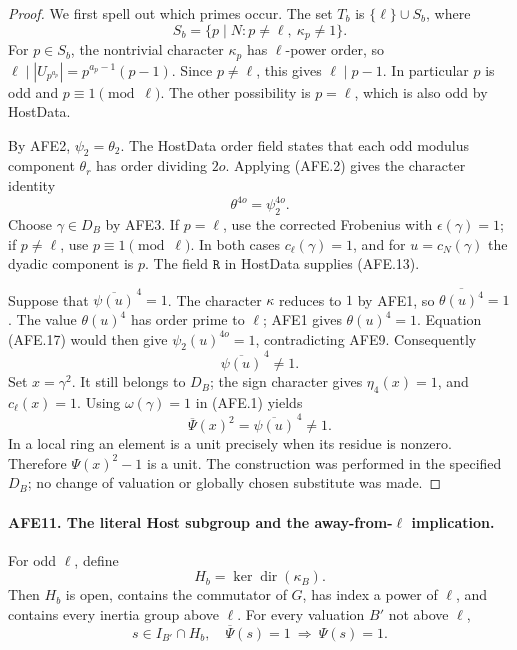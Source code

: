 \documentclass[11pt,a4paper]{article}
\numberwithin{equation}{section}
\theoremstyle{remark}\newtheorem{remark}[theorem]{Remark}
\begin{document}
\begin{proof}
We first spell out which primes occur.
The set \(T_b\) is \(\{\ell\}\cup S_b\), where
\[
 S_b=\{p\mid N:p\ne\ell,\ \kappa_p\ne1\}.
 \]
For \(p\in S_b\), the nontrivial character
\(\kappa_p\) has \(\ell\)-power order, so
\(\ell\mid |U_{p^{a_p}}|=p^{a_p-1}(p-1)\).
Since \(p\ne\ell\), this gives
\(\ell\mid p-1\).  In particular \(p\) is odd and
\(p\equiv1\pmod\ell\).
The other possibility is \(p=\ell\), which is
also odd by HostData.

By AFE2, \(\psi_2=\theta_2\).
The HostData order field states that each odd
modulus component \(\theta_r\) has order dividing
\(2o\).  Applying (AFE.2) gives the character identity
\[
                         \theta^{4o}=\psi_2^{4o}.
                                                        \tag{AFE.17}
\]
Choose \(\gamma\in D_B\) by AFE3.  If \(p=\ell\),
use the corrected Frobenius with \(\epsilon(\gamma)=1\);
if \(p\ne\ell\), use \(p\equiv1\pmod\ell\).
In both cases \(c_\ell(\gamma)=1\), and for
\(u=c_N(\gamma)\) the dyadic component is \(p\).
The field \(\texttt{R}\) in HostData supplies (AFE.13).

Suppose that \(\overline{\psi(u)}^{\,4}=1\).
The character \(\kappa\) reduces to \(1\) by AFE1,
so \(\overline{\theta(u)^4}=1\).
The value \(\theta(u)^4\) has order prime to \(\ell\);
AFE1 gives \(\theta(u)^4=1\).
Equation (AFE.17) would then give
\(\psi_2(u)^{4o}=1\), contradicting AFE9.
Consequently
\[
             \overline{\psi(u)}^{\,4}\ne1.
 \]
Set \(x=\gamma^2\).
It still belongs to \(D_B\);
the sign character gives \(\eta_4(x)=1\), and
\(c_\ell(x)=1\).
Using \(\omega(\gamma)=1\) in (AFE.1) yields
\[
            \overline\Psi(x)^2
                     =\overline{\psi(u)}^{\,4}\ne1.
 \]
In a local ring an element is a unit precisely when
its residue is nonzero.  Therefore
\(\Psi(x)^2-1\) is a unit.  The construction was
performed in the specified \(D_B\); no change of
valuation or globally chosen substitute was made.
\end{proof}

\paragraph{AFE11. The literal Host subgroup and the away-from-\(\ell\) implication.}
\label{claim:AFE11}
For odd \(\ell\), define
\[
                   H_b=\ker\operatorname{dir}(\kappa_B).
                                                        \tag{AFE.18}
\]
Then \(H_b\) is open, contains the commutator of \(G\),
has index a power of \(\ell\), and contains every
inertia group above \(\ell\).
For every valuation \(B'\) not above \(\ell\),
\[
 s\in I_{B'}\cap H_b,\quad\overline\Psi(s)=1
                         \ \Longrightarrow\ \Psi(s)=1.
                                                        \tag{AFE.19}
\]
\end{document}
